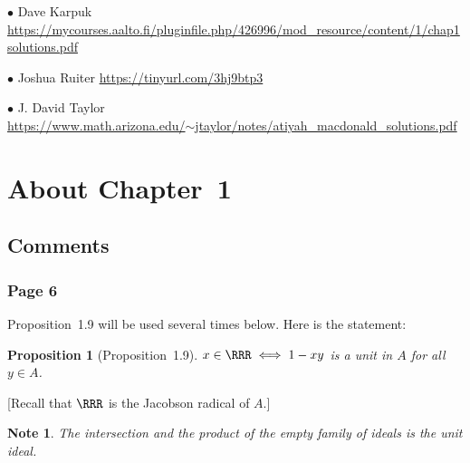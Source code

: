 \documentclass[12pt,letterpaper]{article}%
\newcommand{\bu}{\bullet}
\newcommand{\nn}{\noindent}
\newtheorem{note}[thm]{Note}
\newtheorem{prop}[thm]{Proposition}
\begin{document}


\nn$\bu$ Dave Karpuk\\\href{https://mycourses.aalto.fi/pluginfile.php/426996/mod_resource/content/1/chap1solutions.pdf}{https://mycourses.aalto.fi/pluginfile.php/426996/mod\_resource/content/1/chap1solutions.pdf}

\nn$\bu$ Joshua Ruiter \href{https://tinyurl.com/3hj9btp3}{https://tinyurl.com/3hj9btp3} %

\nn$\bu$ J. David Taylor\\\href{https://www.math.arizona.edu/~jtaylor/notes/atiyah_macdonald_solutions.pdf}{https://www.math.arizona.edu/$\sim$jtaylor/notes/atiyah\_macdonald\_solutions.pdf} 
\medskip 


\newpage

\section{About Chapter~1}%

\subsection{Comments}%

\subsubsection{Page 6}%

Proposition~1.9 will be used several times below. Here is the statement:

\begin{prop}[Proposition~1.9]\label{p1.9}
$x\in\RRR\iff1-xy$ is a unit in $A$ for all $y\in A$.
\end{prop}
[Recall that $\RRR$ is the Jacobson radical of $A$.]

\begin{note}\label{ef}
The intersection and the product of the empty family of ideals is the unit ideal.
\end{note}
\end{document}
